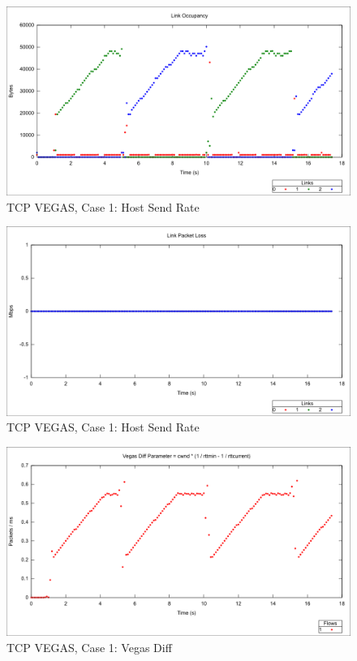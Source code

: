 \begin{figure}[htbp]
    \centering
    \includegraphics[width=\textwidth]{vegas1/Link_Occupancy.png}
    \caption{TCP VEGAS, Case 1: Host Send Rate}
\end{figure}

\begin{figure}[htbp]
    \centering
    \includegraphics[width=\textwidth]{vegas1/Link_Packet_Loss.png}
    \caption{TCP VEGAS, Case 1: Host Send Rate}
\end{figure}

\begin{figure}[htbp]
    \centering
    \includegraphics[width=\textwidth]{vegas1/Vegas_Diff.png}
    \caption{TCP VEGAS, Case 1: Vegas Diff}
\end{figure}


